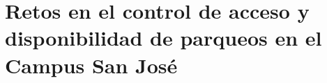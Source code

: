 %
%
%
%
%

\section{Retos en el control de acceso y disponibilidad de parqueos en el Campus San José}

